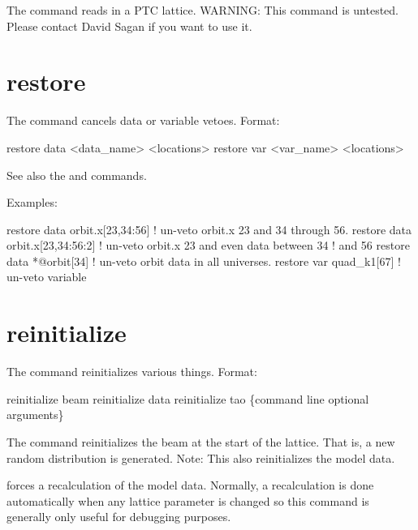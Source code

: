 The  command reads in a PTC lattice. WARNING: This command is
untested. Please contact David Sagan if you want to use it.

\section{restore}
\label{s:restore}

The  command cancels data or variable
vetoes. Format:
\begin{example}
  restore data  <data_name> <locations>
  restore var <var_name> <locations>
\end{example}

\vskip 10pt 

See also the  and  commands.

Examples:
\begin{example}
  restore data orbit.x[23,34:56]   ! un-veto orbit.x 23 and 34 through 56.
  restore data orbit.x[23,34:56:2] ! un-veto orbit.x 23 and even data between 34 
                                   !                                          and 56
  restore data *@orbit[34]         ! un-veto orbit data in all universes.
  restore var quad_k1[67]          ! un-veto variable
\end{example}

\section{reinitialize}
\label{s:reinit}

The  command reinitializes various things. Format:
\begin{example}
  reinitialize beam
  reinitialize data
  reinitialize tao \{command line optional arguments\}
\end{example}

\vskip 10pt 

The  command reinitializes the beam at the start of the
lattice. That is, a new random distribution is generated.  Note: This also reinitializes
the model data.

 forces a recalculation of the model data.  Normally, a
recalculation is done automatically when any lattice parameter is changed so this command
is generally only useful for debugging purposes.

